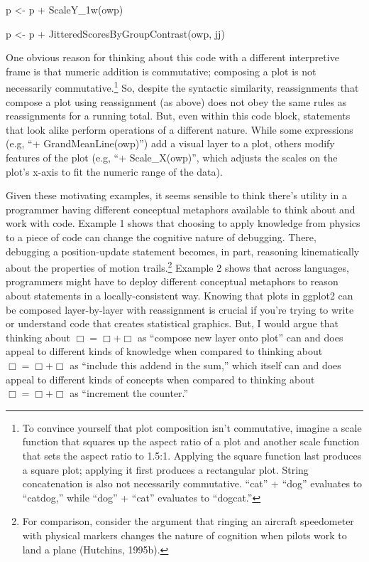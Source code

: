 p \textless{}- p + ScaleY\_1w(owp)

p \textless{}- p + JitteredScoresByGroupContrast(owp, jj)

One obvious reason for thinking about this code with a different
interpretive frame is that numeric addition is commutative; composing a
plot is not necessarily commutative.\footnote{To convince yourself that
  plot composition isn't commutative, imagine a scale function that
  squares up the aspect ratio of a plot and another scale function that
  sets the aspect ratio to 1.5:1. Applying the square function last
  produces a square plot; applying it first produces a rectangular plot.
  String concatenation is also not necessarily commutative. ``cat'' +
  ``dog'' evaluates to ``catdog,'' while ``dog'' + ``cat'' evaluates to
  ``dogcat.''} So, despite the syntactic similarity, reassignments that
compose a plot using reassignment (as above) does not obey the same
rules as reassignments for a running total. But, even within this code
block, statements that look alike perform operations of a different
nature. While some expressions (e.g, ``+ GrandMeanLine(owp)'') add a
visual layer to a plot, others modify features of the plot (e.g, ``+
Scale\_X(owp)'', which adjusts the scales on the plot's x-axis to fit
the numeric range of the data).

Given these motivating examples, it seems sensible to think there's
utility in a programmer having different conceptual metaphors available
to think about and work with code. Example 1 shows that choosing to
apply knowledge from physics to a piece of code can change the cognitive
nature of debugging. There, debugging a position-update statement
becomes, in part, reasoning kinematically about the properties of motion
trails.\footnote{For comparison, consider the argument that ringing an
  aircraft speedometer with physical markers changes the nature of
  cognition when pilots work to land a plane (Hutchins, 1995b).} Example
2 shows that across languages, programmers might have to deploy
different conceptual metaphors to reason about statements in a
locally-consistent way. Knowing that plots in ggplot2 can be composed
layer-by-layer with reassignment is crucial if you're trying to write or
understand code that creates statistical graphics. But, I would argue
that thinking about $\Box = \Box + \Box$ as ``compose new layer onto plot'' can and
does appeal to different kinds of knowledge when compared to thinking
about $\Box = \Box + \Box$ as ``include this addend in the sum,'' which itself can
and does appeal to different kinds of concepts when compared to thinking
about $\Box = \Box + \Box$ as ``increment the counter.''

